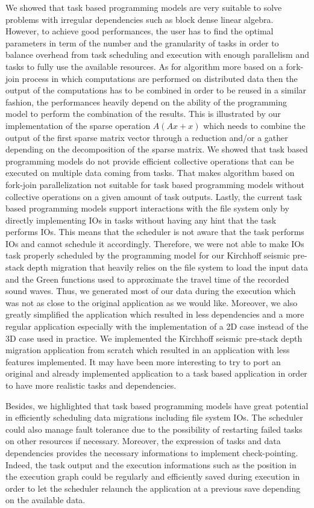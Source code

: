 We showed that task based programming models are very suitable to solve problems with irregular dependencies such as block dense linear algebra.
However, to achieve good performances, the user has to find the optimal parameters in term of the number and the granularity of tasks in order to balance overhead from task scheduling and execution with enough parallelism and tasks to fully use the available resources.
As for algorithm more based on a fork-join process in which computations are performed on distributed data then the output of the computations has to be combined in order to be reused in a similar fashion, the performances heavily depend on the ability of the programming model to perform the combination of the results.
This is illustrated by our implementation of the sparse operation $A(Ax+x)$ which needs to combine the output of the first sparse matrix vector through a reduction and/or a gather depending on the decomposition of the sparse matrix.
We showed that task based programming models do not provide efficient collective operations that can be executed on multiple data coming from tasks.
That makes algorithm based on fork-join parallelization not suitable for task based programming models without collective operations on a given amount of task outputs.
Lastly, the current task based programming models support interactions with the file system only by directly implementing IOs in tasks without having any hint that the task performs IOs.
This means that the scheduler is not aware that the task performs IOs and cannot schedule it accordingly.
Therefore, we were not able to make IOs task properly scheduled by the programming model for our Kirchhoff seismic pre-stack depth migration that heavily relies on the file system to load the input data and the Green functions used to approximate the travel time of the recorded sound waves.
Thus, we generated most of our data during the execution which was not as close to the original application as we would like.
Moreover, we also greatly simplified the application which resulted in less dependencies and a more regular application especially with the implementation of a 2D case instead of the 3D case used in practice.
We implemented the Kirchhoff seismic pre-stack depth migration application from scratch which resulted in an application with less features implemented.
It may have been more interesting to try to port an original and already implemented application to a task based application in order to have more realistic tasks and dependencies.

Besides, we highlighted that task based programming models have great potential in efficiently scheduling data migrations including file system IOs.
The scheduler could also manage fault tolerance due to the possibility of restarting failed tasks on other resources if necessary.
Moreover, the expression of tasks and data dependencies provides the necessary informations to implement check-pointing.
Indeed, the task output and the execution informations such as the position in the execution graph could be regularly and efficiently saved during execution in order to let the scheduler relaunch the application at a previous save depending on the available data.

